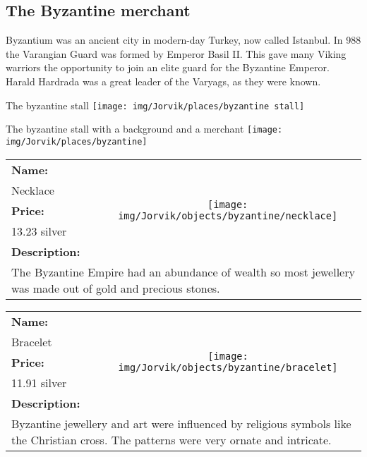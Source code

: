 

\clearpage
\subsection{The Byzantine merchant}
\label{sec:appendix:moj:byzantine}

Byzantium was an ancient city in modern-day Turkey, now called Istanbul. In 988 the Varangian Guard was formed by Emperor Basil II. This gave many Viking warriors the opportunity to join an elite guard for the Byzantine Emperor. Harald Hardrada was a great leader of the Varyags, as they were known.

\begin{display}{The byzantine stall}
	\label{fig:appendix:moj:places:byzantine:stall}
	\texttt{[image: img/Jorvik/places/byzantine stall]}
\end{display}

\begin{display}{The byzantine stall with a background and a merchant}
	\label{fig:appendix:moj:places:byzantine}
	\texttt{[image: img/Jorvik/places/byzantine]}
\end{display}
\clearpage


\begin{table}[ht!]
	\centering
	\begin{tabular}{ p{3cm} c }\toprule
		\textbf{Name:} & \multirow{5}{*}{\texttt{[image: img/Jorvik/objects/byzantine/necklace]}}\\
		Necklace & \\ 
		\textbf{Price:} & \\
		13.23 silver & \\ 
		\textbf{Description:} & \\
		\multicolumn{2}{p{12cm}}{The Byzantine Empire had an abundance of wealth so most jewellery was made out of gold and precious stones.}\\
		\bottomrule
	\end{tabular}
\end{table}

\begin{table}[ht!]
	\centering
	\begin{tabular}{ p{3cm} c }\toprule
		\textbf{Name:} & \multirow{5}{*}{\texttt{[image: img/Jorvik/objects/byzantine/bracelet]}}\\
		Bracelet & \\ 
		\textbf{Price:} & \\
		11.91 silver & \\ 
		\textbf{Description:} & \\
		\multicolumn{2}{p{12cm}}{Byzantine jewellery and art were influenced by religious symbols like the Christian cross. The patterns were very ornate and intricate.}\\
		\bottomrule
	\end{tabular}
\end{table}

